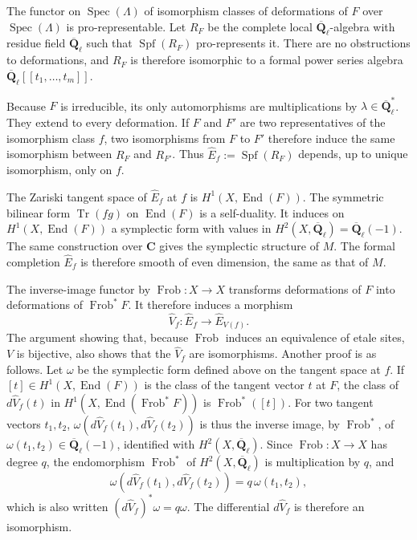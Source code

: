 \documentclass[11pt]{article}
\newcommand{\Qbar}{\overline{\mathbf Q}}
\newcommand{\Spec}{\operatorname{Spec}}
\newcommand{\Frob}{\operatorname{Frob}}
\newcommand{\Tr}{\operatorname{Tr}}
\newcommand{\End}{\operatorname{End}}
\begin{document}
The functor on \(\Spec(\Lambda)\) of isomorphism classes of deformations of \(F\) over \(\Spec(\Lambda)\) is pro-representable. Let \(R_F\) be the complete local \(\Qbar_\ell\)-algebra with residue field \(\Qbar_\ell\) such that \(\operatorname{Spf}(R_F)\) pro-represents it. There are no obstructions to deformations, and \(R_F\) is therefore isomorphic to a formal power series algebra \(\Qbar_\ell[[t_1,\ldots,t_m]]\).

Because \(F\) is irreducible, its only automorphisms are multiplications by \(\lambda\in\Qbar_\ell^*\). They extend to every deformation. If \(F\) and \(F'\) are two representatives of the isomorphism class \(f\), two isomorphisms from \(F\) to \(F'\) therefore induce the same isomorphism between \(R_F\) and \(R_{F'}\). Thus \(\widehat E_f:=\operatorname{Spf}(R_F)\) depends, up to unique isomorphism, only on \(f\).

The Zariski tangent space of \(\widehat E_f\) at \(f\) is \(H^1(X,\End(F))\). The symmetric bilinear form \(\Tr(fg)\) on \(\End(F)\) is a self-duality. It induces on \(H^1(X,\End(F))\) a symplectic form with values in \(H^2(X,\Qbar_\ell)=\Qbar_\ell(-1)\). The same construction over \(\mathbf C\) gives the symplectic structure of \(M\). The formal completion \(\widehat E_f\) is therefore smooth of even dimension, the same as that of \(M\).

The inverse-image functor by \(\Frob:X\to X\) transforms deformations of \(F\) into deformations of \(\Frob^*F\). It therefore induces a morphism
\[
\widehat V_f:\widehat E_f\longrightarrow \widehat E_{V(f)}.
\]
The argument showing that, because \(\Frob\) induces an equivalence of etale sites, \(V\) is bijective, also shows that the \(\widehat V_f\) are isomorphisms. Another proof is as follows. Let \(\omega\) be the symplectic form defined above on the tangent space at \(f\). If \([t]\in H^1(X,\End(F))\) is the class of the tangent vector \(t\) at \(F\), the class of \(d\widehat V_f(t)\) in \(H^1(X,\End(\Frob^*F))\) is \(\Frob^*([t])\). For two tangent vectors \(t_1,t_2\), \(\omega(d\widehat V_f(t_1),d\widehat V_f(t_2))\) is thus the inverse image, by \(\Frob^*\), of \(\omega(t_1,t_2)\in\Qbar_\ell(-1)\), identified with \(H^2(X,\Qbar_\ell)\). Since \(\Frob:X\to X\) has degree \(q\), the endomorphism \(\Frob^*\) of \(H^2(X,\Qbar_\ell)\) is multiplication by \(q\), and
\[
\omega(d\widehat V_f(t_1),d\widehat V_f(t_2))=q\,\omega(t_1,t_2),
\]
which is also written \((d\widehat V_f)^*\omega=q\omega\). The differential \(d\widehat V_f\) is therefore an isomorphism.
\end{document}
